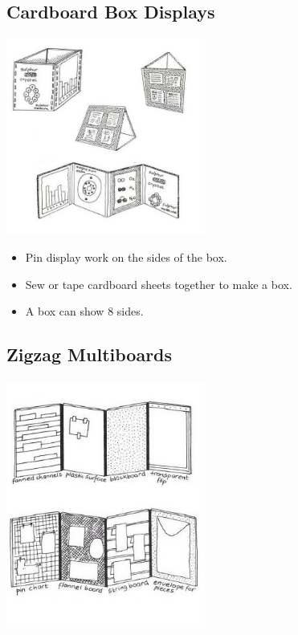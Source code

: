 \begin{multicols}{2}

\section{Cardboard Box Displays} 

\begin{center}
\includegraphics[width=0.49\textwidth]{./img/vso/cardboard-box-2.jpg}
\end{center}

\begin{itemize}
\item Pin display work on the sides of
the box.
\item Sew or tape cardboard sheets
together to make a box.
\item A box can show 8 sides.
\end{itemize}


\subsection{Zigzag Multiboards}

\begin{center}
\includegraphics[width=0.49\textwidth]{./img/vso/zigzag.jpg}
\end{center}


\end{multicols}

